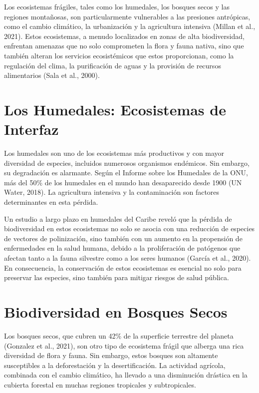 \documentclass[
  letterpaper,
  DIV=11,
  numbers=noendperiod,
  oneside]{scrreprt}
\begin{document}
Los ecosistemas frágiles, tales como los humedales, los bosques secos y
las regiones montañosas, son particularmente vulnerables a las presiones
antrópicas, como el cambio climático, la urbanización y la agricultura
intensiva (Millan et al., 2021). Estos ecosistemas, a menudo localizados
en zonas de alta biodiversidad, enfrentan amenazas que no solo
comprometen la flora y fauna nativa, sino que también alteran los
servicios ecosistémicos que estos proporcionan, como la regulación del
clima, la purificación de aguas y la provisión de recursos alimentarios
(Sala et al., 2000).

\section{Los Humedales: Ecosistemas de
Interfaz}\label{los-humedales-ecosistemas-de-interfaz}

Los humedales son uno de los ecosistemas más productivos y con mayor
diversidad de especies, incluidos numerosos organismos endémicos. Sin
embargo, su degradación es alarmante. Según el Informe sobre los
Humedales de la ONU, más del 50\% de los humedales en el mundo han
desaparecido desde 1900 (UN Water, 2018). La agricultura intensiva y la
contaminación son factores determinantes en esta pérdida.

Un estudio a largo plazo en humedales del Caribe reveló que la pérdida
de biodiversidad en estos ecosistemas no solo se asocia con una
reducción de especies de vectores de polinización, sino también con un
aumento en la propensión de enfermedades en la salud humana, debido a la
proliferación de patógenos que afectan tanto a la fauna silvestre como a
los seres humanos (García et al., 2020). En consecuencia, la
conservación de estos ecosistemas es esencial no solo para preservar las
especies, sino también para mitigar riesgos de salud pública.

\section{Biodiversidad en Bosques
Secos}\label{biodiversidad-en-bosques-secos}

Los bosques secos, que cubren un 42\% de la superficie terrestre del
planeta (Gonzalez et al., 2021), son otro tipo de ecosistema frágil que
alberga una rica diversidad de flora y fauna. Sin embargo, estos bosques
son altamente susceptibles a la deforestación y la desertificación. La
actividad agrícola, combinada con el cambio climático, ha llevado a una
disminución drástica en la cubierta forestal en muchas regiones
tropicales y subtropicales.
\end{document}
